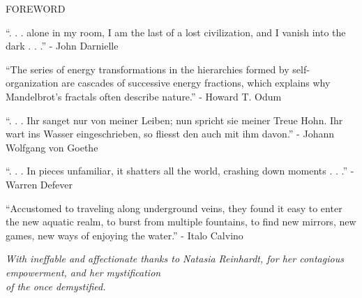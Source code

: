\documentclass[10pt]{article}
\begin{document}
\begingroup
\begin{center}
\huge FOREWORD
\end{center}
\endgroup

\vspace*{2\baselineskip}

\begingroup
\begin{center}
``. . . alone in my room, I am the last of a lost civilization, and I vanish into the dark . . .''
\rightskip\leftskip
\phantom{text} \hfill - John Darnielle
\end{center}
\endgroup

\vspace*{4\baselineskip}

\begingroup
\begin{center}
``The series of energy transformations in the hierarchies formed by self-organization are cascades of successive energy fractions, which explains why Mandelbrot's fractals often describe nature.''
\rightskip\leftskip
\phantom{text} \hfill - Howard T. Odum
\end{center}
\endgroup

\vspace*{4\baselineskip}

\begingroup
\begin{center}
``. . . Ihr sanget nur von meiner Leiben; nun spricht sie meiner Treue Hohn. Ihr wart ins Wasser eingeschrieben, so fliesst den auch mit ihm davon.''
\rightskip\leftskip
\phantom{text} \hfill - Johann Wolfgang von Goethe
\end{center}
\endgroup

\vspace*{4\baselineskip}

\begingroup
\begin{center}
``. . . In pieces unfamiliar, it shatters all the world, crashing down moments . . .''
\rightskip\leftskip
\phantom{text} \hfill - Warren Defever
\end{center}
\endgroup

\vspace*{4\baselineskip}

\begingroup
\begin{center}
``Accustomed to traveling along underground veins, they found it easy to enter the new aquatic realm, to burst from multiple fountains, to find new mirrors, new games, new ways of enjoying the water.''
\rightskip\leftskip
\phantom{text} \hfill - Italo Calvino
\end{center}
\endgroup

\vspace*{12\baselineskip}

\begingroup
\begin{center}
\textit{With ineffable and affectionate thanks to Natasia Reinhardt, for her contagious empowerment, and her mystification \\ of the once demystified.}
\end{center}
\endgroup
\end{document}
